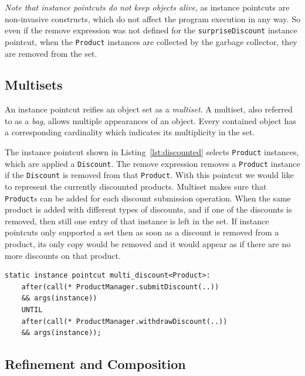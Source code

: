 \documentclass[10pt]{sigplanconf}
\newtheorem{mydef}{Definition}
\newcommand{\lstinln}[1]{\lstinline~#1~}
\begin{document}
\emph{Note that instance pointcuts do not keep objects alive}, as instance pointcuts are non-invasive constructs, which do not affect the program execution in any way. So even if the remove expression was not defined for the \lstinln{surpriseDiscount} instance pointcut, when the \lstinln{Product} instances are collected by the garbage collector, they are removed from the set.

\subsection{Multisets}
An instance pointcut reifies an object set as a \emph{multiset}. A multiset, also referred to as a \emph{bag}, allows multiple appearances of an object. Every contained object has a corresponding cardinality which indicates its multiplicity in the set.
%

The instance pointcut shown in Listing~\ref{lst:discounted} selects \lstinln{Product} instances, which are applied a \lstinln{Discount}. The remove expression removes a \lstinln{Product} instance if the \lstinln{Discount} is removed from that \lstinln{Product}. With this pointcut we would like to represent the currently discounted products. Multiset makes sure that \lstinln{Product}s can be added for each discount submission operation. When the same product is added with different types of discounts, and if one of the discounts is removed, then still one entry of that instance is left in the set.  If instance pointcuts only supported a set then as soon as a discount is removed from a product, its only copy would be removed and it would appear as if there are no more discounts on that product.

\begin{lstlisting}[float=h!, caption={An instance pointcut utilizing multiset property}, label={lst:discounted}]
static instance pointcut multi_discount<Product>:
	after(call(* ProductManager.submitDiscount(..))
	&& args(instance))
	UNTIL
	after(call(* ProductManager.withdrawDiscount(..))
	&& args(instance));
\end{lstlisting}


\subsection{Refinement and Composition}
\end{document}
